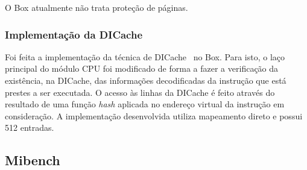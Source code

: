 \documentclass[11pt,twoside]{article}
\begin{document}
O Box atualmente não trata proteção de páginas.

\subsubsection{Implementação da DICache}

Foi feita a implementação da técnica de DICache~\cite{dicache} no Box. Para 
isto, o laço principal do módulo CPU foi modificado de forma a
fazer a verificação da existência, na DICache, das informações decodificadas
da instrução que está prestes a ser executada. O acesso às linhas da DICache
é feito através do resultado de uma função \textit{hash} aplicada no endereço virtual
da instrução em consideração. A implementação desenvolvida utiliza mapeamento
direto e possui 512 entradas. 

\subsection{Mibench}
\end{document}
